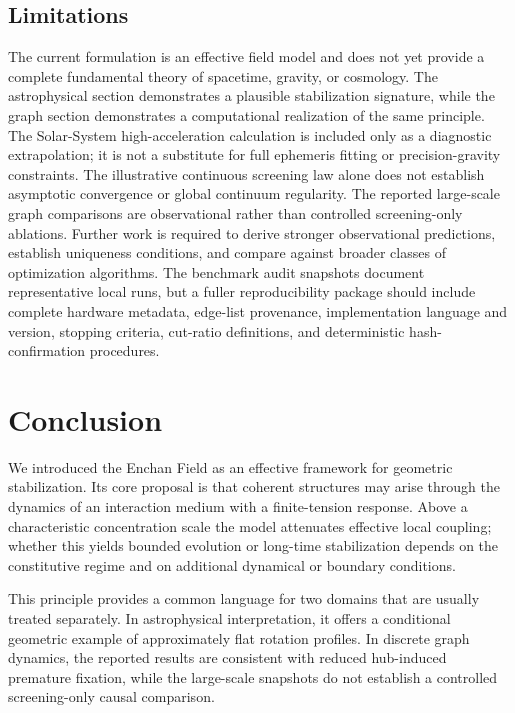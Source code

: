 \documentclass[11pt,a4paper]{article}
\begin{document}
\subsection{Limitations}

The current formulation is an effective field model and does not yet provide a complete fundamental theory of spacetime, gravity, or cosmology. The astrophysical section demonstrates a plausible stabilization signature, while the graph section demonstrates a computational realization of the same principle. The Solar-System high-acceleration calculation is included only as a diagnostic extrapolation; it is not a substitute for full ephemeris fitting or precision-gravity constraints. The illustrative continuous screening law alone does not establish asymptotic convergence or global continuum regularity. The reported large-scale graph comparisons are observational rather than controlled screening-only ablations. Further work is required to derive stronger observational predictions, establish uniqueness conditions, and compare against broader classes of optimization algorithms. The benchmark audit snapshots document representative local runs, but a fuller reproducibility package should include complete hardware metadata, edge-list provenance, implementation language and version, stopping criteria, cut-ratio definitions, and deterministic hash-confirmation procedures.

\section{Conclusion}

We introduced the Enchan Field as an effective framework for geometric stabilization. Its core proposal is that coherent structures may arise through the dynamics of an interaction medium with a finite-tension response. Above a characteristic concentration scale the model attenuates effective local coupling; whether this yields bounded evolution or long-time stabilization depends on the constitutive regime and on additional dynamical or boundary conditions.

This principle provides a common language for two domains that are usually treated separately. In astrophysical interpretation, it offers a conditional geometric example of approximately flat rotation profiles. In discrete graph dynamics, the reported results are consistent with reduced hub-induced premature fixation, while the large-scale snapshots do not establish a controlled screening-only causal comparison.
\end{document}
